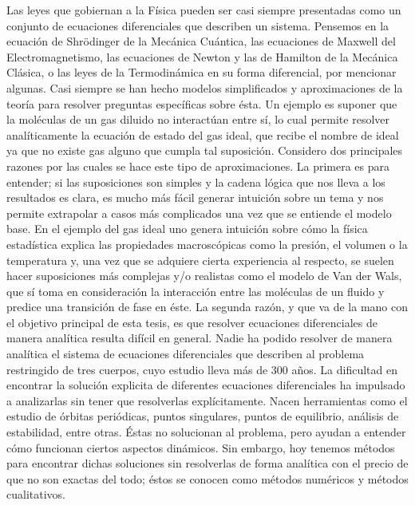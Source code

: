 Las leyes que gobiernan a la Física pueden ser casi siempre presentadas como un conjunto de ecuaciones diferenciales que describen un sistema. Pensemos en la ecuación de Shrödinger de la Mecánica Cuántica, las ecuaciones de Maxwell del Electromagnetismo, las ecuaciones de Newton y las de Hamilton de la Mecánica Clásica, o las leyes de la Termodinámica en su forma diferencial, por mencionar algunas. Casi siempre se han hecho modelos simplificados y aproximaciones de la teoría para resolver preguntas específicas sobre ésta. Un ejemplo es suponer que la moléculas de un gas diluido no interactúan entre sí, lo cual permite resolver analíticamente la ecuación de estado del gas ideal, que recibe el nombre de ideal ya que no existe gas alguno que cumpla tal suposición. Considero dos principales razones por las cuales se hace este tipo de aproximaciones. La primera es para entender; si las suposiciones son simples y la cadena lógica que nos lleva a los resultados es clara, es mucho más fácil generar intuición sobre un tema y nos permite extrapolar a casos más complicados una vez que se entiende el modelo base. En el ejemplo del gas ideal uno genera intuición sobre cómo la física estadística explica las propiedades macroscópicas como la presión, el volumen o la temperatura y, una vez que se adquiere cierta experiencia al respecto, se suelen hacer suposiciones más complejas y/o realistas como el modelo de Van der Wals, que sí toma en consideración la interacción entre las moléculas de un fluido y predice una transición de fase en éste. La segunda razón, y que va de la mano con el objetivo principal de esta tesis, es que resolver ecuaciones diferenciales de manera analítica resulta difícil en general. Nadie ha podido resolver de manera analítica el sistema de ecuaciones diferenciales que describen al problema restringido de tres cuerpos, cuyo estudio lleva más de 300 años. La dificultad en encontrar la solución explicita de diferentes ecuaciones diferenciales ha impulsado a analizarlas sin tener que resolverlas explícitamente. Nacen herramientas como el estudio de órbitas periódicas, puntos singulares, puntos de equilibrio, análisis de estabilidad, entre otras. Éstas no solucionan al problema, pero ayudan a entender cómo funcionan ciertos aspectos dinámicos. Sin embargo, hoy tenemos métodos para encontrar dichas soluciones sin resolverlas de forma analítica con el precio de que no son exactas del todo; éstos se conocen como métodos numéricos y métodos cualitativos.

